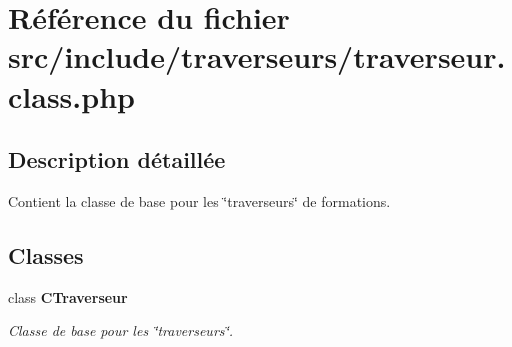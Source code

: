 \section{Référence du fichier src/include/traverseurs/traverseur.class.php}
\label{traverseur_8class_8php}


\subsection{Description détaillée}
Contient la classe de base pour les \char`\"{}traverseurs\char`\"{} de formations. 



\subsection*{Classes}
\begin{CompactItemize}
\item 
class {\bf CTraverseur}
\begin{CompactList}\small\item\em Classe de base pour les \char`\"{}traverseurs\char`\"{}. \item\end{CompactList}\end{CompactItemize}
